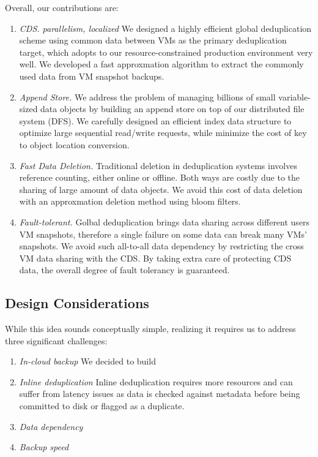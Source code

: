 Overall, our contributions are:
\begin{enumerate}
\item {\em CDS. parallelism, localized}
We designed a highly efficient global deduplication scheme using common data between VMs as the primary
deduplication target, which adopts to our resource-constrained production environment very well. We developed a fast
approxmation algorithm to extract the commonly used data from VM snapshot backups.

\item {\em Append Store.}
We address the problem of managing billions of small variable-sized data objects by building an append store
on top of our distributed file system (DFS). We carefully designed an efficient index data structure to 
optimize large sequential read/write requests, while minimize the cost of key to object location conversion.

\item {\em Fast Data Deletion.}
Traditional deletion in deduplication systems involves reference counting, either online or offline. Both ways
are costly due to the sharing of large amount of data objects.
We avoid this cost of data deletion with an approxmation deletion method using bloom filters.

\item {\em Fault-tolerant.}
Golbal deduplication brings data sharing across different users VM snapshots, therefore a single failure
on some data can break many VMs' snapshots. We avoid such all-to-all data dependency by restricting
the cross VM data sharing with the CDS. By taking extra care of protecting CDS data, 
the overall degree of fault tolerancy is guaranteed.

\end{enumerate}

\subsection{Design Considerations}
While this idea sounds conceptually simple, realizing it requires us to address three
significant challenges:
\begin{enumerate}
\item {\em In-cloud backup}
We decided to build 
\item {\em Inline deduplication}
Inline deduplication requires more resources and can suffer from latency issues as data is checked against metadata before being committed to disk or flagged as a duplicate.
\item {\em Data dependency}

\item {\em Backup speed}

\end{enumerate}

